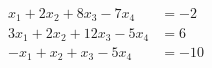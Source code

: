 \begin{align*}
x_1+2x_2+8x_3-7x_4&=-2\\
3x_1+2x_2+12x_3-5x_4&=6\\
-x_1+x_2+x_3-5x_4&=-10
\end{align*}
